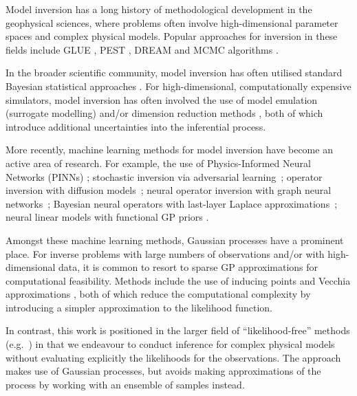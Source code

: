 \documentclass{article}
\theoremstyle{plain}
\theoremstyle{definition}
\theoremstyle{remark}
\begin{document}
Model inversion has a long history of methodological development in the geophysical sciences, where problems often involve high-dimensional parameter spaces and complex physical models.  Popular approaches for inversion in these fields include GLUE \cite{Beven2014}, PEST \cite{Doherty2010}, DREAM \cite{Vrugt2011} and MCMC algorithms \cite{Oh2001}.

In the broader scientific community, model inversion has often utilised standard Bayesian statistical approaches \cite{StuartInverse2010,DashtiBayesian2015,TarantolaInverse2005}.  For high-dimensional, computationally expensive simulators, model inversion has often involved the use of model emulation (surrogate modelling) \cite{Hooten2011FirstOrder, GramacyLocal2015, Gopalan2021HOSVD, ColeLocallyInduced2021} and/or dimension reduction methods \cite{Higdon2008SVDEmulator, SiadeSnapshot2010, Grana2019}, both of which introduce additional uncertainties into the inferential process.

More recently, machine learning methods for model inversion have become an active area of research.  For example, the use of Physics-Informed Neural Networks (PINNs) \cite{HePhysicsinformed2020,YangPhysicsInformed2020,ZhangLearning2020}; stochastic inversion via adversarial learning~\cite{XuAdversarial2019,BaoNumerical2020,ChuLearning2021}; operator inversion with diffusion models~\cite{SongSolving2022,JalalRobust2021};
neural operator inversion with graph neural networks~\cite{LiNeural2020};
Bayesian neural operators with last-layer Laplace approximations~\cite{MagnaniApproximate2022}; neural linear models with functional GP priors \cite{WatsonNeural2020}.

Amongst these machine learning methods, Gaussian processes have a prominent place.  For inverse problems with large numbers of observations and/or with high-dimensional data, it is common to resort to sparse GP approximations for computational feasibility.  Methods include the use of inducing points \cite{Bauer2016} and Vecchia approximations \cite{Katzfuss2020}, both of which reduce the computational complexity by introducing a simpler approximation to the likelihood function.

In contrast, this work is positioned in the larger field of ``likelihood-free'' methods (e.g.~\citet{CranmerFrontier2020}) in that we endeavour to conduct inference for complex physical models without evaluating explicitly the likelihoods for the observations.  The approach makes use of Gaussian processes, but avoids making approximations of the process by working with an ensemble of samples instead.
\end{document}
